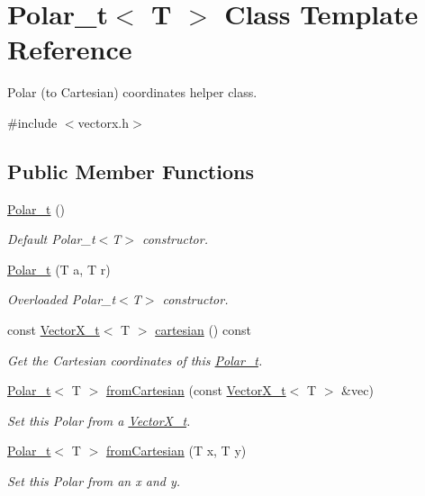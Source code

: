 \hypertarget{class_polar__t}{}\section{Polar\+\_\+t$<$ T $>$ Class Template Reference}
\label{class_polar__t}


Polar (to Cartesian) coordinates helper class.  




{\ttfamily \#include $<$vectorx.\+h$>$}

\subsection*{Public Member Functions}
\begin{DoxyCompactItemize}
\item 
\mbox{\label{class_polar__t_a4e6f79af5d5419c4d48a9b91a8743889}} 
\hyperlink{class_polar__t_a4e6f79af5d5419c4d48a9b91a8743889}{Polar\+\_\+t} ()
\begin{DoxyCompactList}\small\item\em Default Polar\+\_\+t$<$\+T$>$ constructor. \end{DoxyCompactList}\item 
\hyperlink{class_polar__t_a862fc0e18df7dad1470152e6ef2bd340}{Polar\+\_\+t} (T a, T r)
\begin{DoxyCompactList}\small\item\em Overloaded Polar\+\_\+t$<$\+T$>$ constructor. \end{DoxyCompactList}\item 
const \hyperlink{class_vector_x__t}{Vector\+X\+\_\+t}$<$ T $>$ \hyperlink{class_polar__t_aa4f91bf6479b2d2cefb22d79de8e1d42}{cartesian} () const
\begin{DoxyCompactList}\small\item\em Get the Cartesian coordinates of this \hyperlink{class_polar__t}{Polar\+\_\+t}. \end{DoxyCompactList}\item 
\hyperlink{class_polar__t}{Polar\+\_\+t}$<$ T $>$ \hyperlink{class_polar__t_a7a7ea302869a50342c010083943a2dbc}{from\+Cartesian} (const \hyperlink{class_vector_x__t}{Vector\+X\+\_\+t}$<$ T $>$ \&vec)
\begin{DoxyCompactList}\small\item\em Set this Polar from a \hyperlink{class_vector_x__t}{Vector\+X\+\_\+t}. \end{DoxyCompactList}\item 
\hyperlink{class_polar__t}{Polar\+\_\+t}$<$ T $>$ \hyperlink{class_polar__t_a18fa5c39eddf7f3554ddcec7ea95eb27}{from\+Cartesian} (T x, T y)
\begin{DoxyCompactList}\small\item\em Set this Polar from an x and y. \end{DoxyCompactList}\end{DoxyCompactItemize}
